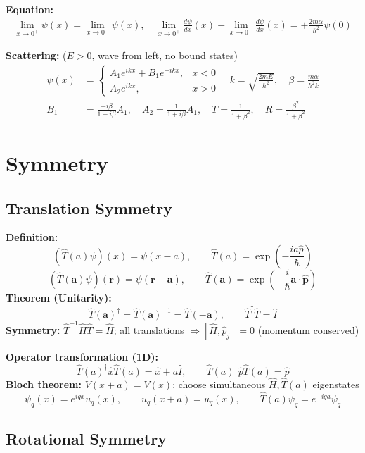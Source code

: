 \documentclass[12pt]{article}
\begin{document}
\textbf{Equation: }
\begin{align}
    \lim_{x \to 0^+} \psi(x) = \lim_{x \to 0^-} \psi(x), \quad \lim_{x \to 0^+} \frac{d\psi}{dx}(x) - \lim_{x \to 0^-} \frac{d\psi}{dx}(x) = +\frac{2m\alpha}{\hbar^2} \psi(0)
\end{align}

\textbf{Scattering: } ($E > 0$, wave from left, no bound states)
\begin{align}
    \psi(x) &= \begin{cases}
    A_1 e^{ikx} + B_1 e^{-ikx}, & x < 0 \\
    A_2 e^{ikx}, & x > 0
\end{cases} \quad k = \sqrt{\frac{2mE}{\hbar^2}}, \quad \beta = \frac{m\alpha}{\hbar^2 k} \\
B_1 &= \frac{-i\beta}{1+i\beta} A_1, \quad A_2 = \frac{1}{1+i\beta} A_1, \quad T = \frac{1}{1+\beta^2}, \quad R = \frac{\beta^2}{1+\beta^2}
\end{align}

\section{Symmetry}

\subsection{Translation Symmetry}

\textbf{Definition:}
\[
  (\hat T(a)\psi)(x)=\psi(x-a),\qquad
  \hat T(a)=\exp\left(-\frac{ia\hat p}{\hbar}\right)
\]
\[
  (\hat T(\boldsymbol a)\psi)(\boldsymbol r)=\psi(\boldsymbol r-\boldsymbol a),
  \qquad
  \hat T(\boldsymbol a)=\exp\left(-\frac{i}{\hbar}\boldsymbol a\cdot\hat{\boldsymbol p}\right)
\]
\textbf{Theorem (Unitarity):}
\[
  \hat T(\boldsymbol a)^\dagger=\hat T(\boldsymbol a)^{-1}=\hat T(-\boldsymbol a),
  \qquad \hat T^\dagger\hat T=\hat I
\]
\textbf{Symmetry:} $\hat T^{-1}\hat H\hat T=\hat H$;
all translations $\Rightarrow[\hat H,\hat p_j]=0$ (momentum conserved)

\textbf{Operator transformation (1D):}
\[
  \hat T(a)^\dagger\hat x\hat T(a)=\hat x+a\hat I,\qquad
  \hat T(a)^\dagger\hat p\hat T(a)=\hat p
\]
\textbf{Bloch theorem:} $V(x+a)=V(x)$; choose simultaneous $\hat H,\hat T(a)$ eigenstates
\[
  \psi_q(x)=e^{iqx}u_q(x),\qquad u_q(x+a)=u_q(x),\qquad
  \hat T(a)\psi_q=e^{-iqa}\psi_q
\]

\subsection{Rotational Symmetry}
\end{document}
